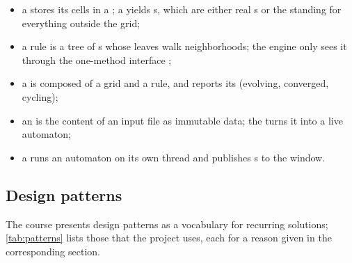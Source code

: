 \begin{itemize}
    \item a  stores its cells in a ; a  yields
          s, which are either real s or the  standing for
          everything outside the grid;
    \item a rule is a tree of s whose  leaves walk neighborhoods; the
          engine only sees it through the one-method interface ;
    \item a  is composed of a grid and a rule, and reports its
           (evolving, converged, cycling);
    \item an  is the content of an input file as immutable data; the
           turns it into a live automaton;
    \item a  runs an automaton on its own thread and publishes s
          to the window.
\end{itemize}

\subsection{Design patterns}

The course presents design patterns as a vocabulary for recurring solutions; \cref{tab:patterns}
lists those that the project uses, each for a reason given in the corresponding section.

